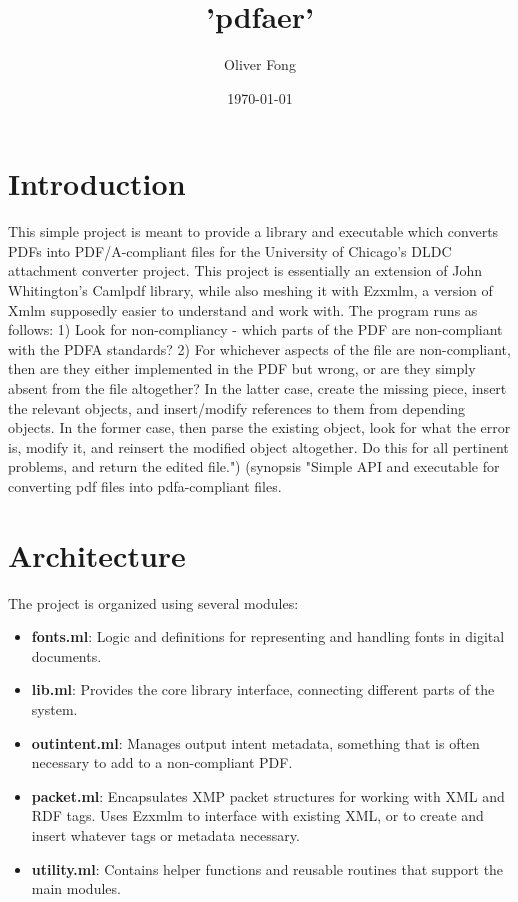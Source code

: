 \documentclass[11pt]{article}
\title{'pdfaer'}
\author{Oliver Fong}
\date{\today}
\begin{document}
\maketitle

\tableofcontents

\section*{Introduction}
This simple project is meant to provide a library and executable which converts PDFs
into PDF/A-compliant files for the University of Chicago's DLDC attachment converter project.
This project is essentially an extension of John Whitington's Camlpdf library, while also
meshing it with Ezxmlm, a version of Xmlm supposedly easier to understand and work with.
The program runs as follows: 1) Look for non-compliancy - which parts of the PDF are non-compliant
with the PDFA standards? 2) For whichever aspects of the file are non-compliant, then are they
either implemented in the PDF but wrong, or are they simply absent from the file altogether? In 
the latter case, create the missing piece, insert the relevant objects, and insert/modify references to them from
depending objects. In the former case, then parse the existing object, look for what the error is, modify it, and
reinsert the modified object altogether. Do this for all pertinent problems, and return the edited file.")
 (synopsis "Simple API and executable for converting pdf files into pdfa-compliant files.

\section*{Architecture}
The project is organized using several modules:
\begin{itemize}
  \item \textbf{fonts.ml}: Logic and definitions for representing and handling fonts in digital documents.
  \item \textbf{lib.ml}: Provides the core library interface, connecting different parts of the system.
  \item \textbf{outintent.ml}: Manages output intent metadata, something that is often necessary to add to a non-compliant PDF.
  \item \textbf{packet.ml}: Encapsulates XMP packet structures for working with XML and RDF tags. Uses Ezxmlm to interface with existing XML, or to create and insert whatever tags or metadata necessary.
  \item \textbf{utility.ml}: Contains helper functions and reusable routines that support the main modules.
\end{itemize}
\end{document}
